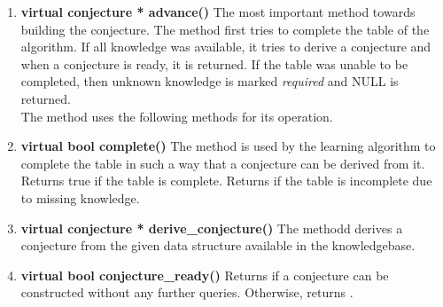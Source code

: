 \begin{enumerate}
 \item \textbf{virtual conjecture * advance()} \vskip 1pt
	The most important method towards building the conjecture. The method first tries to complete the table of the algorithm. If all knowledge was available, it tries to derive a conjecture and when a conjecture is ready, it is returned. If the table was unable to be completed, then unknown knowledge is marked \emph{required} and NULL is returned. \\
	The method uses the following methods for its operation.

 \item \textbf{virtual bool complete()} \vskip 1pt
	The method is used by the learning algorithm to complete the table in such a way that a conjecture can be derived from it. Returns true if the table is complete. Returns \false if the table is incomplete due to missing knowledge. 

 \item \textbf{virtual conjecture * derive\_conjecture()} \vskip 1pt
	The methodd derives a conjecture from the given data structure available in the knowledgebase. 

 \item \textbf{virtual bool conjecture\_ready()} \vskip 1pt
	Returns \true if a conjecture can be constructed without any further queries. Otherwise, returns \false.
\end{enumerate}






